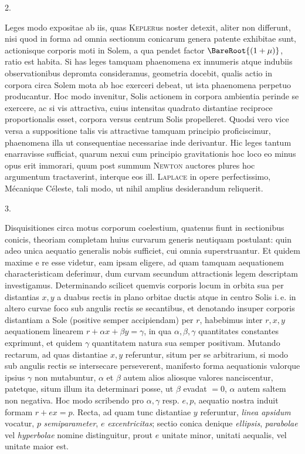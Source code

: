 \clearpage
{}
\begin{center}
2.
\end{center}
Leges modo expositae ab iis, quas \textsc{Kepler}us noster detexit, aliter non differunt, nisi quod in forma ad omnia sectionum conicarum genera patente exhibitae sunt, actionisque corporis moti in Solem, a qua pendet factor $\BareRoot{(1+\mu)}$, ratio est habita. Si has leges tamquam phaenomena ex innumeris atque indubiis observationibus depromta consideramus, geometria docebit, qualis actio
in corpora circa Solem mota ab hoc exerceri debeat, ut ista phaenomena perpetuo producantur. Hoc modo invenitur, Solis actionem in corpora ambientia perinde se exercere, ac si vis attractiva, cuius intensitas quadrato distantiae reciproce proportionalis esset, corpora versus centrum Solis propelleret. Quodsi vero vice versa a suppositione talis vis attractivae tamquam principio proficiscimur, phaenomena illa ut consequentiae necessariae inde derivantur. Hic leges tantum enarravisse sufficiat, quarum nexui cum principio gravitationis hoc loco eo minus opus erit immorari, quum post summum \textsc{Newton} auctores plures hoc argumentum tractaverint, interque eos ill. \textsc{Laplace} in opere perfectissimo, Mécanique Céleste, tali modo, ut nihil amplius desiderandum reliquerit.

\begin{center}
3.
\end{center}

Disquisitiones circa motus corporum coelestium, quatenus fiunt in sectionibus conicis, theoriam completam huius curvarum generis neutiquam postulant: quin adeo unica aequatio generalis nobis sufficiet, cui omnia superstruantur. Et quidem maxime e re esse videtur, eam ipsam eligere, ad quam tamquam aequationem characteristicam deferimur, dum curvam secundum attractionis legem descriptam investigamus. Determinando scilicet quemvis corporis locum in orbita sua per distantias $x, y$ a duabus rectis in plano orbitae ductis atque in centro Solis i.\,e. in altero curvae foco sub angulis rectis se secantibus, et denotando insuper corporis distantiam a Sole (positive semper accipiendam) per $r$, habebimus inter $r, x, y$ aequationem linearem $r+\alpha x+\beta y=\gamma$, in qua $\alpha, \beta, \gamma$ quantitates constantes exprimunt, et quidem $\gamma$ quantitatem natura sua semper positivam. Mutando rectarum, ad quas distantiae $x, y$ referuntur, situm per se arbitrarium, si modo sub angulis rectis se intersecare perseverent, manifesto forma aequationis valorque ipsius $\gamma$ non mutabuntur, $\alpha$ et $\beta$ autem alios aliosque valores nanciscentur, patetque, situm illum ita determinari posse, ut $\beta$ evadat $=0$, $\alpha$ autem saltem non negativa. Hoc modo scribendo pro $\alpha, \gamma$ resp. $e, p$, aequatio nostra induit formam $r+ex=p$. Recta, ad quam tunc distantiae $y$ referuntur, \emph{linea apsidum} vocatur, $p$ \emph{semiparameter}, $e$ \emph{excentricitas}; sectio conica denique \emph{ellipsis}, \emph{parabolae} vel \emph{hyperbolae} nomine distinguitur, prout $e$ unitate minor, unitati aequalis, vel unitate maior est.
